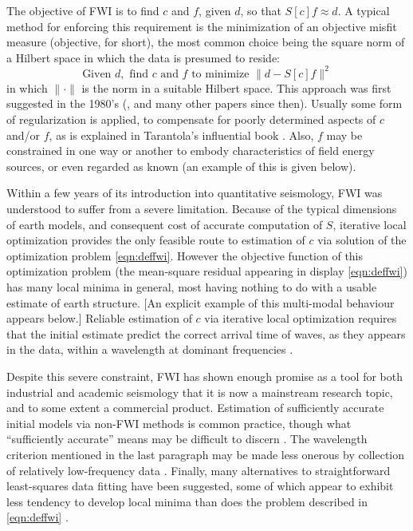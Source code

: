 The objective of FWI is to find $c$ and $f$, given $d$, so that
$S[c]f \approx d$. A typical method for enforcing this requirement is
the minimization of an objective misfit measure (objective, for
short), the most common choice being the square norm of a Hilbert
space in which the data is presumed to reside:
\begin{equation}
  \label{eqn:deffwi}
  \mbox{Given } d, \mbox{ find }c \mbox{ and }f \mbox{ to
    minimize }
  \|d -  S[c]f\|^2
\end{equation}
in which $\|\cdot\|$ is the norm in a suitable Hilbert space. This
approach was first suggested in the 1980's
(\cite{BamChavLai:79,Tara:84a,KolbColLai:86,Crasetal:90}, and many
other papers since then). Usually some form of regularization is
applied, to compensate for poorly determined aspects of $c$ and/or
$f$, as is explained in Tarantola's influential book
\cite[]{Tarantola:05}. Also, $f$ may be constrained in one way or
another to embody characteristics of field energy sources, or even
regarded as known (an example of this is given below).

Within a few years of its introduction into quantitative seismology,
FWI was understood to suffer from a severe limitation. Because of the
typical dimensions of earth models, and consequent cost of accurate
computation of $S$, iterative local optimization provides the only
feasible route to estimation of $c$ via solution of the optimization
problem \ref{eqn:deffwi}. However the objective function of this
optimization problem (the mean-square residual appearing in display \ref{eqn:deffwi}) has many local minima in general, most
having nothing to do with a usable estimate of earth structure. [An
explicit example of this multi-modal behaviour appears below.]
Reliable estimation of $c$ via iterative local optimization requires
that the initial estimate predict the correct arrival time of waves,
as they appears in the data, within a wavelength at dominant
frequencies \cite[]{GauTarVir:86,VirieuxOperto:09}.

Despite this severe constraint, FWI has shown enough promise as a tool
for both industrial and academic seismology that it is now a
mainstream research topic, and to some extent a commercial
product. Estimation of sufficiently accurate initial models via
non-FWI methods is common practice, though what ``sufficiently
accurate'' means may be difficult to discern
\cite[]{Plessix:10}. The wavelength criterion mentioned in the last
paragraph may be made less onerous by collection of relatively
low-frequency data \cite[]{Wolfspar:16}. Finally, many alternatives to
straightforward least-squares data fitting have been suggested, some
of which appear to exhibit less tendency to develop local minima than
does the problem described in \ref{eqn:deffwi} \cite[]{Symes:09}.

